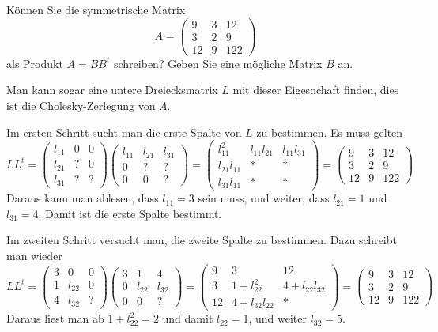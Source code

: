Können Sie die symmetrische Matrix
\[
A=\begin{pmatrix}
 9& 3& 12\\
 3& 2&  9\\
12& 9&122
\end{pmatrix}
\]
als Produkt $A=BB^t$ schreiben? Geben Sie eine mögliche Matrix $B$ an.

\begin{loesung}
Man kann sogar eine untere Dreiecksmatrix $L$ mit dieser Eigesnchaft finden,
dies ist die Cholesky-Zerlegung von $A$.

Im ersten Schritt sucht man die erste Spalte von $L$ zu bestimmen.
Es muss gelten
\[
LL^t=
\begin{pmatrix}
l_{11}&  0&  0\\
l_{21}&  ?&  0\\
l_{31}&  ?&  ?
\end{pmatrix}
\begin{pmatrix}
l_{11}&l_{21}&l_{31}\\
     0&     ?&     ?\\
     0&     0&     ?
\end{pmatrix}
=
\begin{pmatrix}
    l_{11}^2&l_{11}l_{21}&l_{11}l_{31}\\
l_{21}l_{11}&           *&           *\\
l_{31}l_{11}&           *&           *
\end{pmatrix}
=
\begin{pmatrix}
 9& 3& 12\\
 3& 2&  9\\
12& 9&122
\end{pmatrix}
\]
Daraus kann man ablesen, dass $l_{11}=3$ sein muss, und weiter,
dass
$l_{21}=1$ und $l_{31}=4$. Damit ist die erste Spalte bestimmt.

Im zweiten Schritt versucht man, die zweite Spalte zu bestimmen.
Dazu schreibt man wieder
\[
LL^t
=
\begin{pmatrix}
3&     0&0\\
1&l_{22}&0\\
4&l_{32}&?
\end{pmatrix}
\begin{pmatrix}
3&     1&     4\\
0&l_{22}&l_{32}\\
0&     0&?
\end{pmatrix}
=
\begin{pmatrix}
 9&3           &          12\\
 3& 1+l_{22}^2  &4+l_{22}l_{32}\\
12& 4+l_{32}l_{22}&         *
\end{pmatrix}
=
\begin{pmatrix}
 9& 3& 12\\
 3& 2&  9\\
12& 9&122
\end{pmatrix}
\]
Daraus liest man ab $1+l_{22}^2=2$ und damit $l_{22}=1$, und weiter
$l_{32}=5$.


\end{loesung}

